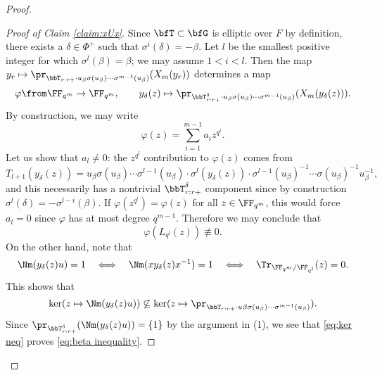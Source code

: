 \begin{proof}
\begin{proof}[Proof of Claim \ref{claim:xUx}]
    Since $\bfT \subset \bfG$ is elliptic over $F$ by definition, there exists a $\delta \in \Phi^+$ such that $\sigma^i(\delta) = -\beta$. Let $l$ be the smallest positive integer for which $\sigma^l(\beta) = \beta$; we may assume $1 < i < l$. Then the map $y_r \mapsto \pr_{\bbT_{r:r+} \cdot u_\beta \sigma(u_\beta) \cdots \sigma^{m-1}(u_\beta)}(X_m(y_r))$ determines a map
    \begin{equation*}
      \varphi \from \FF_{q^m} \to \FF_{q^m}, \qquad y_\delta(z) \mapsto \pr_{\bbT_{r:r+}^\delta \cdot u_\beta \sigma(u_\beta) \cdots \sigma^{m-1}(u_\beta)}(X_m(y_\delta(z))).
    \end{equation*}
    By construction, we may write
    \begin{equation*}
      \varphi(z) = \sum_{i=1}^{m-1} a_i z^{q^i}.
    \end{equation*}
    Let us show that $a_l \neq 0$: the $z^{q^l}$ contribution to $\varphi(z)$ comes from 
    \begin{equation*}
      T_{l+1}(y_\delta(z)) = u_\beta \sigma(u_\beta) \cdots \sigma^{l-1}(u_\beta) \cdot \sigma^{l}(y_\delta(z)) \cdot \sigma^{l-1}(u_\beta)^{-1} \cdots \sigma(u_\beta)^{-1} u_\beta^{-1},
    \end{equation*}
    and this necessarily has a nontrivial $\bbT_{r:r+}^\delta$ component since by construction $\sigma^l(\delta) = -\sigma^{l-i}(\beta)$. If $\varphi(z^{q^l}) = \varphi(z)$ for all $z \in \FF_{q^m}$, this would force $a_l = 0$ since $\varphi$ has at most degree $q^{m-1}$. Therefore we may conclude that 
    \begin{equation*}
      \varphi(L_{q^l}(z)) \not\equiv 0.
    \end{equation*}
    On the other hand, note that 
    \begin{equation*}
      \Nm(y_\delta(z) u) = 1 \quad \Longleftrightarrow \quad \Nm(xy_\delta(z) x^{-1}) = 1 \quad \Longleftrightarrow \quad \Tr_{\FF_{q^m}/\FF_{q^l}}(z) = 0.
    \end{equation*}
    This shows that 
    \begin{equation}\label{eq:ker neq}
      \ker(z \mapsto \Nm(y_\delta(z) u)) \not\subseteq \ker(z \mapsto \pr_{\bbT_{r:r+} \cdot u \beta \sigma(u_\beta) \cdots \sigma^{m-1}(u_\beta)}).
    \end{equation}
    Since $\pr_{\bbT_{r:r+}^\delta}(\Nm(y_\delta(z) u)) = \{1\}$ by the argument in (1), we see that \eqref{eq:ker neq} proves \eqref{eq:beta inequality}.
  \end{proof}


\end{proof}
